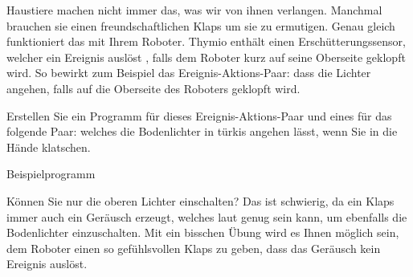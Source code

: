
\bigskip
{}

Haustiere machen nicht immer das, was wir von ihnen verlangen. Manchmal brauchen sie einen freundschaftlichen Klaps um sie zu ermutigen. Genau gleich funktioniert das mit Ihrem Roboter. Thymio enthält einen Erschütterungssensor, welcher ein Ereignis auslöst , falls dem Roboter kurz auf seine Oberseite geklopft wird. So bewirkt zum Beispiel das Ereignis-Aktions-Paar: 
dass die Lichter angehen, falls auf die Oberseite des Roboters geklopft wird.

Erstellen Sie ein Programm für dieses Ereignis-Aktions-Paar und eines für das folgende Paar:  welches die Bodenlichter in türkis angehen lässt, wenn Sie in die Hände klatschen.

{\raggedleft \hfill Beispielprogramm }

Können Sie nur die oberen Lichter einschalten? Das ist schwierig, da ein Klaps immer auch ein Geräusch erzeugt, welches laut genug sein kann, um ebenfalls die Bodenlichter einzuschalten. Mit ein bisschen Übung wird es Ihnen möglich sein, dem Roboter einen so gefühlsvollen Klaps zu geben, dass das Geräusch kein Ereignis auslöst.


\bigskip

